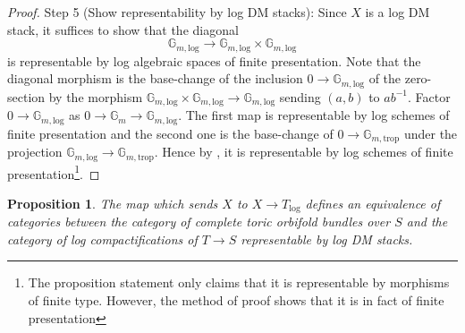 \documentclass[11pt]{amsart}
\newtheorem{proposition}[theorem]{Proposition}
\theoremstyle{definition}
\theoremstyle{remark}
\def\log{\mathrm{log}}
\def\trop{\mathrm{trop}}
\begin{document}
\begin{proof}
	Step 5 (Show representability by log DM stacks): Since
	$X$ is a log DM stack, it suffices to show that the diagonal
	$$\mathbb{G}_{m,\log}\to \mathbb{G}_{m,\log}\times \mathbb{G}_{m,\log}$$
	is representable by log algebraic spaces of finite presentation. Note
	that the diagonal morphism is the base-change of the inclusion
	$0\to \mathbb{G}_{m,\log}$ of the zero-section by the morphism
	$\mathbb{G}_{m,\log}\times\mathbb{G}_{m,\log}\to \mathbb{G}_{m,\log}$
	sending $(a,b)$ to $ab^{-1}$. Factor $0\to \mathbb{G}_{m,\log}$
	as $0\to \mathbb{G}_m\to \mathbb{G}_{m,\log}$. The first
	map is representable by log schemes of finite presentation
	and the second one is the base-change of $0\to \mathbb{G}_{m,\trop}$
	under the projection $\mathbb{G}_{m,\log}\to \mathbb{G}_{m,\trop}$.
	Hence by \cite[Proposition 2.2.7.5]{TheLogarithmicMolcho2022}, it is
	representable by log schemes of finite presentation\footnote{The proposition
		statement only claims that it is representable by morphisms of finite type.
	However, the method of proof shows that it is in fact of finite presentation}.
\end{proof}

\begin{proposition}
	\label{prop:equiv_cat_tor_compact}
	The map which sends $X$ to $X\to T_{\log}$ defines an equivalence
	of categories between the category of complete toric orbifold bundles
	over $S$ and the category of log compactifications
	of $T\to S$ representable by log DM stacks.
\end{proposition}
\end{document}
